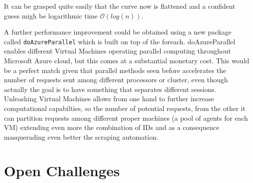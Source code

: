 \documentclass[
  12pt,
  a4paper,
  oneside]{book}
\theoremstyle{definition}
\theoremstyle{definition}
\theoremstyle{definition}
\theoremstyle{remark}
\begin{document}
It can be grasped quite easily that the curve now is flattened and a confident guess migh be logarithmic time \(\mathcal{O}(log(n))\).

A further performance improvement could be obtained using a new package called \texttt{doAzureParallel} which is built on top of the foreach. doAzureParallel enables different Virtual Machines operating parallel computing throughout Microsoft Azure cloud, but this comes at a substantial monetary cost. This would be a perfect match given that parallel methods seen before accelerates the number of requests sent among different processors or cluster, even though actually the goal is to have something that separates different sessions. Unleashing Virtual Machines allows from one hand to further increase computational capabilties, so the number of potential requests, from the other it can partition requests among different proper machines (a pool of agents for each VM) extending even more the combination of IDs and as a consequence masquerading even better the scraping automation.

\hypertarget{challenges}{%
\section{Open Challenges}\label{challenges}}
\end{document}
